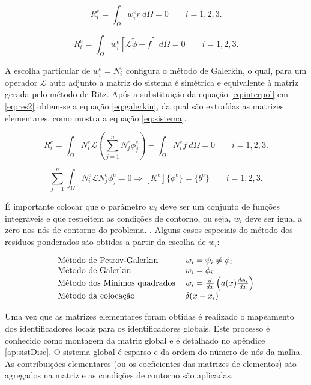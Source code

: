 \documentclass[
    12pt,               %
    openright,          %
    oneside,
    a4paper,            %
    english,            %
    french,             %
    spanish,            %
    brazil              %
    ]{abntex2}
\begin{document}
\begin{equation}
\label{eq:res1}
R_i^e = \int_{\Omega}{w_i^e r \ d\Omega} = 0 \qquad i = 1,2,3.
\end{equation}

\begin{equation}
\label{eq:res2}
R_i^e = \int_{\Omega}{w_i^e [\mathcal{L} \tilde{\phi} - f] \ d\Omega} = 0  \qquad i = 1,2,3.
\end{equation}  


A escolha particular de $w_i^e = N^e_i$ configura o método de Galerkin, o qual, para um operador $\mathcal{L}$ auto adjunto a matriz do sistema é simétrica e equivalente à matriz gerada pelo método de Ritz. Após a substituição da equação \ref{eq:interpol} em \ref{eq:res2} obtem-se a equação \ref{eq:galerkin}, da qual são extraídas as matrizes elementares, como mostra a equação \ref{eq:sistema}.


\begin{equation}
\label{eq:galerkin}
R_i^e = \int_{\Omega}{N_i^e \mathcal{L} \left( \sum_{j=1}^{n}{N_j^e \phi_j^e} \right) } - \int_{\Omega}{N^e_i f \ d \Omega} = 0  \qquad i = 1,2,3.
\end{equation} 


\begin{equation}
\label{eq:sistema}
\sum_{j=1}^{n}\int_{\Omega}{N_i^e \mathcal{L} N_j^e  \phi_j^e  } = 0 \Rightarrow [K^e]\{\phi^e\} = \{b^e\} \qquad i = 1,2,3.
\end{equation}  

É importante colocar que o parâmetro $w_i$ deve ser um conjunto de funções integraveis e que respeitem as condições de contorno, ou seja, $w_i$ deve ser igual a zero nos nós de contorno do problema.
\cite{reddy}. Alguns casos especiais do método dos resíduos ponderados são obtidos a partir da escolha de $w_i$:

\begin{equation}
\label{eq:metPond}
\begin{tabular}{ l l }
Método de Petrov-Galerkin & $ w_i = \psi_i \neq \phi_i $ \\ 
Método de Galerkin & $ w_i = \phi_i $\\  
Método dos Mínimos quadrados & $ w_i = \frac{d}{dx} \left(a(x)\frac{d \phi_i}{dx}\right) $ \\ 
Método da colocação & $ \delta(x - x_i)  $ 
\end{tabular}
\end{equation}

Uma vez que as matrizes elementares foram obtidas é realizado o mapeamento dos identificadores locais para os identificadores globais. Este processo é conhecido como montagem da matriz global e é detalhado no apêndice \ref{ap:sistDisc}. O sistema global é esparso e da ordem do número de nós da malha. As contribuições elementares (ou os coeficientes das matrizes de elementos) são agregados na matriz e as condições de contorno são aplicadas.
\end{document}
